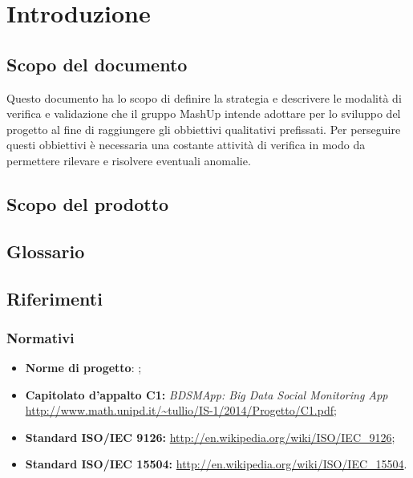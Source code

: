 %


\section{Introduzione}
	\subsection{Scopo del documento}
	Questo documento ha lo scopo di definire la strategia e descrivere le modalità di verifica e validazione che il gruppo MashUp intende adottare per lo sviluppo del progetto al fine di raggiungere gli obbiettivi qualitativi prefissati. Per perseguire questi obbiettivi è necessaria una costante attività di verifica in modo da permettere rilevare e risolvere eventuali anomalie.

	\subsection{Scopo del prodotto}
		\productScope

	\subsection{Glossario}
		\glossarioDesc

	\subsection{Riferimenti}
		\subsubsection{Normativi}
			\begin{itemize}
  				\item \textbf{Norme di progetto}: \docNameVersionNdP;
  				\item \textbf{Capitolato d'appalto C1:} \textit{BDSMApp: Big Data Social Monitoring App} \url{http://www.math.unipd.it/~tullio/IS-1/2014/Progetto/C1.pdf};
  				\item \textbf{Standard ISO/IEC 9126:} \url{http://en.wikipedia.org/wiki/ISO/IEC_9126};
  				\item \textbf{Standard ISO/IEC 15504:} \url{http://en.wikipedia.org/wiki/ISO/IEC_15504}.
			\end{itemize}

